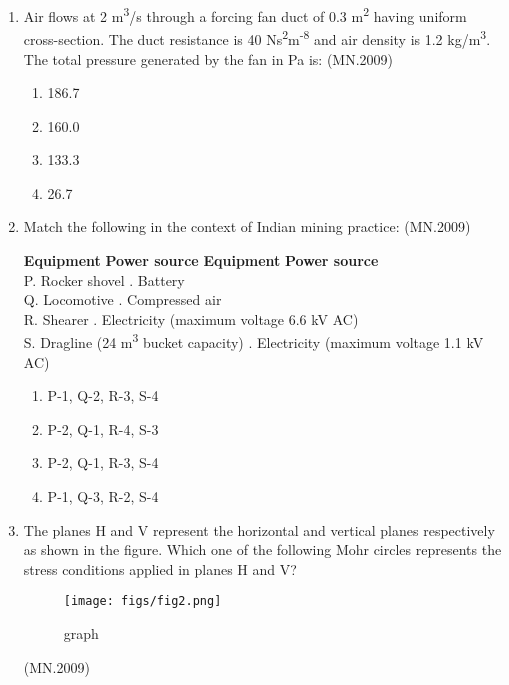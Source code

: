 \documentclass[journal]{IEEEtran}
\numberwithin{equation}{enumi}
\numberwithin{figure}{enumi}
\begin{document}
\begin{enumerate}
    \item Air flows at 2 m\textsuperscript{3}/s through a forcing fan duct of 0.3 m\textsuperscript{2} having uniform cross-section. The duct resistance is 40 Ns\textsuperscript{2}m\textsuperscript{-8} and air density is 1.2 kg/m\textsuperscript{3}. The total pressure generated by the fan in Pa is:
    \hfill{(MN.2009)}
    \begin{enumerate}
        \item 186.7
        \item 160.0
        \item 133.3
        \item 26.7
    \end{enumerate}

    \item Match the following in the context of Indian mining practice:
\hfill{(MN.2009)}
\begin{tabbing}
    \hspace{5cm} \= \textbf{Equipment} \hspace{6cm} \= \textbf{Power source} \kill
    \textbf{Equipment} \> \textbf{Power source} \\
    P. Rocker shovel . Battery \\
    Q. Locomotive . Compressed air \\
    R. Shearer . Electricity (maximum voltage 6.6 kV AC) \\
    S. Dragline (24 m\textsuperscript{3} bucket capacity) . Electricity (maximum voltage 1.1 kV AC) \\
    \end{tabbing}

    \begin{enumerate}
        \item P-1, Q-2, R-3, S-4
        \item P-2, Q-1, R-4, S-3
        \item P-2, Q-1, R-3, S-4
        \item P-1, Q-3, R-2, S-4
    \end{enumerate}

\item The planes H and V represent the horizontal and vertical planes respectively as shown in the figure. Which one of the following Mohr circles represents the stress conditions applied in planes H and V?

\begin{figure}[H]
\centering
\texttt{[image: figs/fig2.png]}
\caption{graph}
\label{fig:placeholder}
\end{figure}
\hfill{(MN.2009)}


\end{enumerate}
\end{document}
